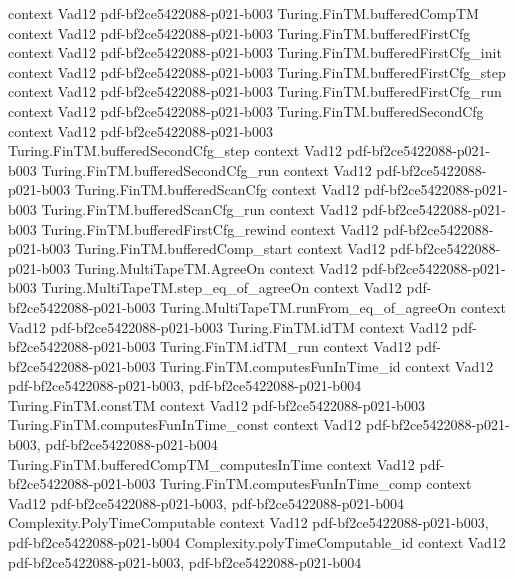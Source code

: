 \begin{theorem}
  {context}
  {Vad12}
  {pdf-bf2ce5422088-p021-b003}
\proofstep
  {Turing.FinTM.bufferedCompTM}
  {context}
  {Vad12}
  {pdf-bf2ce5422088-p021-b003}
\proofstep
  {Turing.FinTM.bufferedFirstCfg}
  {context}
  {Vad12}
  {pdf-bf2ce5422088-p021-b003}
\proofstep
  {Turing.FinTM.bufferedFirstCfg_init}
  {context}
  {Vad12}
  {pdf-bf2ce5422088-p021-b003}
\proofstep
  {Turing.FinTM.bufferedFirstCfg_step}
  {context}
  {Vad12}
  {pdf-bf2ce5422088-p021-b003}
\proofstep
  {Turing.FinTM.bufferedFirstCfg_run}
  {context}
  {Vad12}
  {pdf-bf2ce5422088-p021-b003}
\proofstep
  {Turing.FinTM.bufferedSecondCfg}
  {context}
  {Vad12}
  {pdf-bf2ce5422088-p021-b003}
\proofstep
  {Turing.FinTM.bufferedSecondCfg_step}
  {context}
  {Vad12}
  {pdf-bf2ce5422088-p021-b003}
\proofstep
  {Turing.FinTM.bufferedSecondCfg_run}
  {context}
  {Vad12}
  {pdf-bf2ce5422088-p021-b003}
\proofstep
  {Turing.FinTM.bufferedScanCfg}
  {context}
  {Vad12}
  {pdf-bf2ce5422088-p021-b003}
\proofstep
  {Turing.FinTM.bufferedScanCfg_run}
  {context}
  {Vad12}
  {pdf-bf2ce5422088-p021-b003}
\proofstep
  {Turing.FinTM.bufferedFirstCfg_rewind}
  {context}
  {Vad12}
  {pdf-bf2ce5422088-p021-b003}
\proofstep
  {Turing.FinTM.bufferedComp_start}
  {context}
  {Vad12}
  {pdf-bf2ce5422088-p021-b003}
\proofstep
  {Turing.MultiTapeTM.AgreeOn}
  {context}
  {Vad12}
  {pdf-bf2ce5422088-p021-b003}
\proofstep
  {Turing.MultiTapeTM.step_eq_of_agreeOn}
  {context}
  {Vad12}
  {pdf-bf2ce5422088-p021-b003}
\proofstep
  {Turing.MultiTapeTM.runFrom_eq_of_agreeOn}
  {context}
  {Vad12}
  {pdf-bf2ce5422088-p021-b003}
\proofstep
  {Turing.FinTM.idTM}
  {context}
  {Vad12}
  {pdf-bf2ce5422088-p021-b003}
\proofstep
  {Turing.FinTM.idTM_run}
  {context}
  {Vad12}
  {pdf-bf2ce5422088-p021-b003}
\proofstep
  {Turing.FinTM.computesFunInTime_id}
  {context}
  {Vad12}
  {pdf-bf2ce5422088-p021-b003,
    pdf-bf2ce5422088-p021-b004}
\proofstep
  {Turing.FinTM.constTM}
  {context}
  {Vad12}
  {pdf-bf2ce5422088-p021-b003}
\proofstep
  {Turing.FinTM.computesFunInTime_const}
  {context}
  {Vad12}
  {pdf-bf2ce5422088-p021-b003,
    pdf-bf2ce5422088-p021-b004}
\proofstep
  {Turing.FinTM.bufferedCompTM_computesInTime}
  {context}
  {Vad12}
  {pdf-bf2ce5422088-p021-b003}
\proofstep
  {Turing.FinTM.computesFunInTime_comp}
  {context}
  {Vad12}
  {pdf-bf2ce5422088-p021-b003,
    pdf-bf2ce5422088-p021-b004}
\proofstep
  {Complexity.PolyTimeComputable}
  {context}
  {Vad12}
  {pdf-bf2ce5422088-p021-b003,
    pdf-bf2ce5422088-p021-b004}
\proofstep
  {Complexity.polyTimeComputable_id}
  {context}
  {Vad12}
  {pdf-bf2ce5422088-p021-b003,
    pdf-bf2ce5422088-p021-b004}

\end{theorem}
